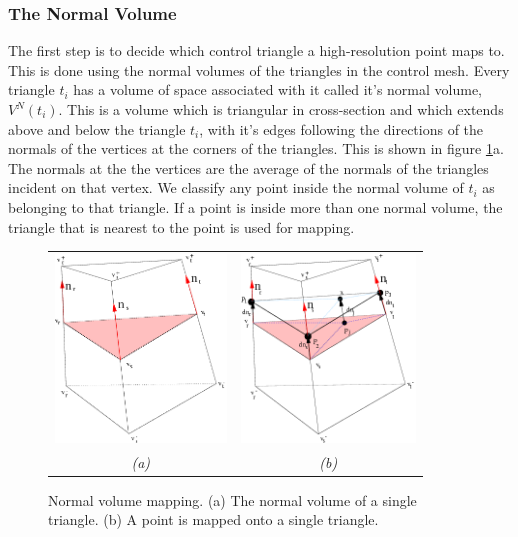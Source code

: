 \documentclass[10pt,oneside,fleqn,a4paper]{book}
\begin{document}
\subsubsection{The Normal Volume}
The first step is to decide which control triangle a high-resolution point maps to. This is done using the normal volumes of the triangles in the control mesh. Every triangle $t_i$ has a volume of space associated with it called it's normal volume, $V^N(t_i)$. This is a volume which is triangular in cross-section and which extends above and below the triangle $t_i$, with it's edges following the directions of the normals of the vertices at the corners of the triangles. This is shown in figure \ref{fig:normalvolume}a. The normals at the the vertices are the average of the normals of the triangles incident on that vertex. We classify any point inside the normal volume of $t_i$ as belonging to that triangle. If a point is inside more than one normal volume, the triangle that is nearest to the point is used for mapping.

\begin{figure}
\begin{center}
\begin{tabular}{cc}
\includegraphics[height=5cm]{../images/normal_volume} &
\includegraphics[height=5cm]{../images/point-to-surface} \\
{\it (a)} & {\it (b)}
\end{tabular}
\caption[Normal volume and point-to-surface mapping]{\label{fig:normalvolume} Normal volume mapping. (a) The normal volume of a single triangle. (b) A point is mapped onto a single triangle.}
\end{center}
\end{figure}
\end{document}
